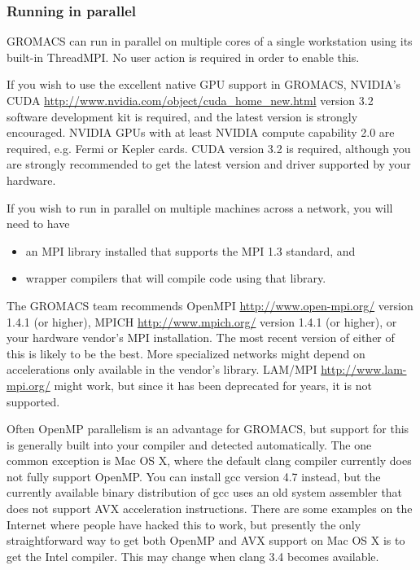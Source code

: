 \documentclass{article}[12pt,a4paper,twoside]
\newcommand{\gromacs}{GROMACS}
\newcommand{\nvidia}{NVIDIA}
\newcommand{\cuda}{CUDA}
\newcommand{\mpi}{MPI}
\newcommand{\threadmpi}{ThreadMPI}
\newcommand{\openmpi}{OpenMPI}
\newcommand{\openmp}{OpenMP}
\newcommand{\lammpi}{LAM/MPI}
\newcommand{\mpich}{MPICH}
\newcommand{\avx}{AVX}
\newcommand{\cudaversion}{3.2}
\begin{document}
\subsubsection{Running in parallel}

\gromacs{} can run in parallel on multiple cores of a single
workstation using its built-in \threadmpi. No user action is required
in order to enable this.

If you wish to use the excellent native GPU support in \gromacs,
\nvidia{}'s \cuda{}
\url{http://www.nvidia.com/object/cuda_home_new.html} version
\cudaversion{} software development kit is required, and the latest
version is strongly encouraged. \nvidia{} GPUs with at least \nvidia{}
compute capability 2.0 are required, e.g. Fermi or Kepler cards. CUDA
version 3.2 is required, although you are strongly recommended to get
the latest version and driver supported by your hardware.

If you wish to run in parallel on multiple machines across a network,
you will need to have
\begin{itemize}
\item an \mpi{} library installed that supports the \mpi{} 1.3
  standard, and
\item wrapper compilers that will compile code using that library.
\end{itemize}
The \gromacs{} team recommends \openmpi{}
\url{http://www.open-mpi.org/} version 1.4.1 (or higher), \mpich{}
\url{http://www.mpich.org/} version 1.4.1 (or higher), or your
hardware vendor's \mpi{} installation. The most recent version of
either of this is likely to be the best. More specialized networks
might depend on accelerations only available in the vendor's library.
 \lammpi{}
\url{http://www.lam-mpi.org/} might work, but since it has been
deprecated for years, it is not supported.

Often \openmp{} parallelism is an advantage for \gromacs{},
but support for this is generally built into your compiler and detected
automatically. The one common exception is Mac OS X, where the default
clang compiler currently does not fully support OpenMP. You can install
gcc version 4.7 instead, but the currently available binary distribution of gcc 
uses an old system assembler that does not support \avx{} acceleration
instructions. There are some examples on the Internet where people have
hacked this to work, but presently the only straightforward way to get
both OpenMP and \avx{} support on Mac OS X is to get the Intel compiler.
This may change when clang 3.4 becomes available.
\end{document}
